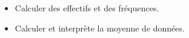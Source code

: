 \begin{prerequis}[Objectifs de 5\up{e}]  
    \begin{itemize}  
        \item Calculer des effectifs et des fréquences.
        \item Calculer et interprète la moyenne de données.
    \end{itemize}
\end{prerequis}
